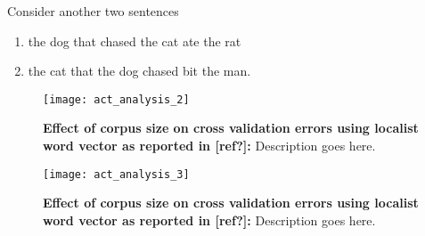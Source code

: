 Consider another two sentences 
\begin{enumerate}[noitemsep]
\item the dog that chased the cat ate the rat \label{eg-1:or-sent-17}
\item the cat that the dog chased bit the man. \label{eg-1:or-sent-23}
\end{enumerate}


\begin{figure}[hbtp]
\centering
\texttt{[image: act\_analysis\_2]}
\caption{\textbf{Effect of corpus size on cross validation errors using localist word vector as reported in [ref?]:} Description goes here.}
\label{fig:act_analysis_2}
\end{figure}

\begin{figure}[hbtp]
\centering
\texttt{[image: act\_analysis\_3]}
\caption{\textbf{Effect of corpus size on cross validation errors using localist word vector as reported in [ref?]:} Description goes here.}
\label{fig:act_analysis_3}
\end{figure}


 
 

 
 


